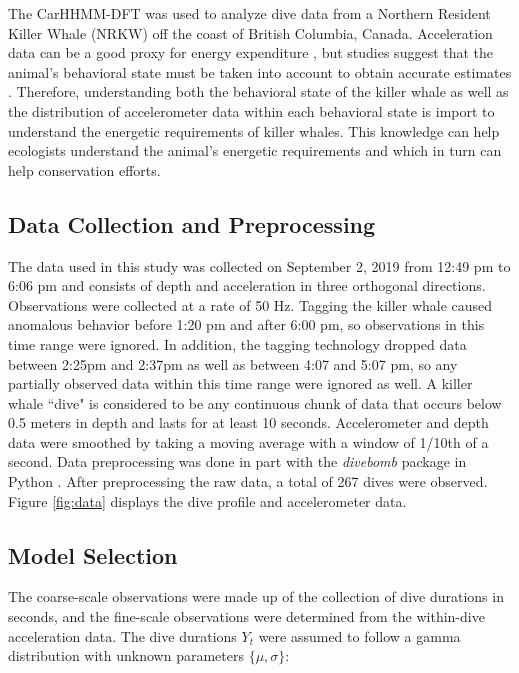 

The CarHHMM-DFT was used to analyze dive data from a Northern Resident Killer Whale (NRKW) off the coast of British Columbia, Canada. Acceleration data can be a good proxy for energy expenditure \citep{Green:2009}, but studies suggest that the animal's behavioral state must be taken into account to obtain accurate estimates \citep{Dot:2016}. Therefore, understanding both the behavioral state of the killer whale as well as the distribution of accelerometer data within each behavioral state is import to understand the energetic requirements of killer whales. This knowledge can help ecologists understand the animal's energetic requirements and which in turn can help conservation efforts.

\subsection{Data Collection and Preprocessing}

The data used in this study was collected on September 2, 2019 from 12:49 pm to 6:06 pm and consists of depth and acceleration in three orthogonal directions. Observations were collected at a rate of 50 Hz. Tagging the killer whale caused anomalous behavior before 1:20 pm and after 6:00 pm, so observations in this time range were ignored. In addition, the tagging technology dropped data between 2:25pm and 2:37pm as well as between 4:07 and 5:07 pm, so any partially observed data within this time range were ignored as well. A killer whale ``dive" is considered to be any continuous chunk of data that occurs below 0.5 meters in depth and lasts for at least 10 seconds. Accelerometer and depth data were smoothed by taking a moving average with a window of 1/10th of a second. Data preprocessing was done in part with the \textit{divebomb} package in Python \citep{Nunes:2018}. After preprocessing the raw data, a total of 267 dives were observed. Figure \ref{fig:data} displays the dive profile and accelerometer data.

\subsection{Model Selection}

The coarse-scale observations were made up of the collection of dive durations in seconds, and the fine-scale observations were determined from the within-dive acceleration data. The dive durations $Y_t$ were assumed to follow a gamma distribution with unknown parameters $\{\mu,\sigma\}$:

